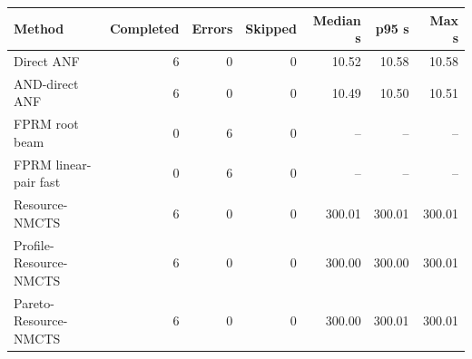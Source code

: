\begin{tabular}{lrrrrrr}
\toprule
Method & Completed & Errors & Skipped & Median s & p95 s & Max s \\
\midrule
Direct ANF & 6 & 0 & 0 & 10.52 & 10.58 & 10.58 \\
AND-direct ANF & 6 & 0 & 0 & 10.49 & 10.50 & 10.51 \\
FPRM root beam & 0 & 6 & 0 & -- & -- & -- \\
FPRM linear-pair fast & 0 & 6 & 0 & -- & -- & -- \\
Resource-NMCTS & 6 & 0 & 0 & 300.01 & 300.01 & 300.01 \\
Profile-Resource-NMCTS & 6 & 0 & 0 & 300.00 & 300.00 & 300.01 \\
Pareto-Resource-NMCTS & 6 & 0 & 0 & 300.00 & 300.01 & 300.01 \\
\bottomrule
\end{tabular}
